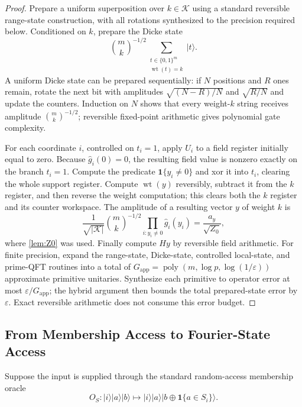 \documentclass[11pt,letterpaper]{article}
\theoremstyle{definition}
\newcommand{\Kcal}{\mathcal{K}}
\newcommand{\wt}{\operatorname{wt}}
\newcommand{\poly}{\operatorname{poly}}
\newcommand{\ket}[1]{\lvert #1\rangle}
\newcommand{\abs}[1]{\left\lvert #1\right\rvert}
\newcommand{\one}{\mathbf{1}}
\begin{document}
\begin{proof}
Prepare a uniform superposition over $k\in\Kcal$ using a standard reversible range-state construction, with all rotations synthesized to the precision required below. Conditioned on $k$, prepare the Dicke state
\[
   \binom mk^{-1/2}\sum_{\substack{t\in\{0,1\}^m\\\wt(t)=k}}\ket{t}.
\]
A uniform Dicke state can be prepared sequentially: if $N$ positions and $R$ ones remain, rotate the next bit with amplitudes $\sqrt{(N-R)/N}$ and $\sqrt{R/N}$ and update the counters.  Induction on $N$ shows that every weight-$k$ string receives amplitude $\binom mk^{-1/2}$; reversible fixed-point arithmetic gives polynomial gate complexity.

For each coordinate $i$, controlled on $t_i=1$, apply $U_i$ to a field register initially equal to zero.  Because $\widehat g_i(0)=0$, the resulting field value is nonzero exactly on the branch $t_i=1$.  Compute the predicate $\one\{y_i\ne0\}$ and xor it into $t_i$, clearing the whole support register.  Compute $\wt(y)$ reversibly, subtract it from the $k$ register, and then reverse the weight computation; this clears both the $k$ register and its counter workspace.  The amplitude of a resulting vector $y$ of weight $k$ is
\[
   \frac1{\sqrt{\abs{\Kcal}}}\binom mk^{-1/2}
   \prod_{i:y_i\ne0}\widehat g_i(y_i)
   =\frac{a_y}{\sqrt{Z_0}},
\]
where \cref{lem:Z0} was used.  Finally compute $Hy$ by reversible field arithmetic.  For finite precision, expand the range-state, Dicke-state, controlled local-state, and prime-QFT routines into a total of $G_{\mathrm{app}}=\poly(m,\log p,\log(1/\varepsilon))$ approximate primitive unitaries.  Synthesize each primitive to operator error at most $\varepsilon/G_{\mathrm{app}}$; the hybrid argument then bounds the total prepared-state error by $\varepsilon$.  Exact reversible arithmetic does not consume this error budget.
\end{proof}

\subsection{From Membership Access to Fourier-State Access}

Suppose the input is supplied through the standard random-access membership oracle
\begin{equation}
   O_S:\ket{i}\ket{a}\ket{b}
   \longmapsto
   \ket{i}\ket{a}\ket{b\oplus\one\{a\in S_i\}}.
   \label{eq:membership-oracle}
\end{equation}
\end{document}
